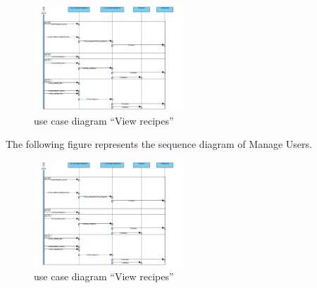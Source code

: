 \documentclass{article}
\begin{document}
{{{{{{{{\begin{figure}[htbp]
    \centering
    \includegraphics[width=0.5\textwidth]{mandia}
    \caption{use case diagram “View recipes”}
    \label{fig:design2}
\end{figure}
The following figure represents the sequence diagram of Manage Users.\\
\begin{figure}[htbp]
    \centering
    \includegraphics[width=0.5\textwidth]{mandia}
    \caption{use case diagram “View recipes”}
    \label{fig:design2}
\end{figure}


















































}}}}}}}}
\end{document}
